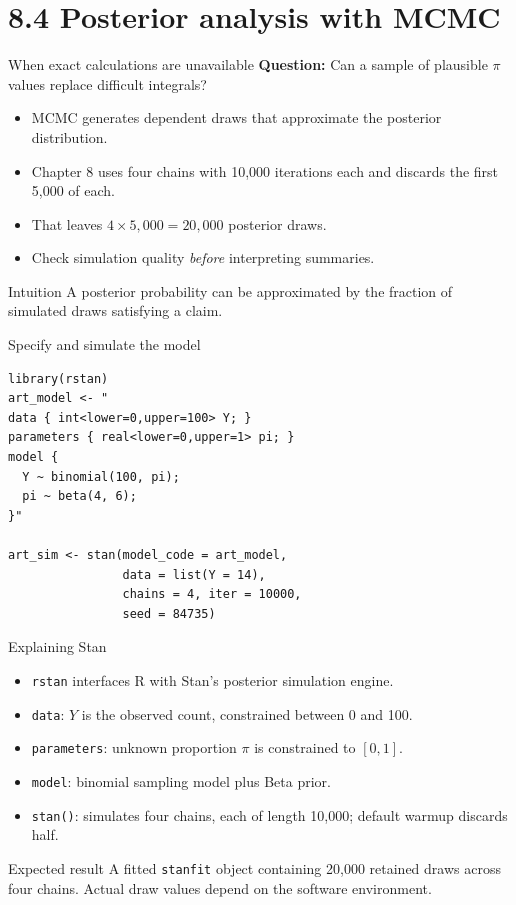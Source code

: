 \documentclass[aspectratio=43]{beamer}
\begin{document}
\section{8.4 Posterior analysis with MCMC}
\begin{frame}{When exact calculations are unavailable}
\textbf{Question:} Can a sample of plausible $\pi$ values replace difficult integrals?
\begin{itemize}
\item MCMC generates dependent draws that approximate the posterior distribution.
\item Chapter 8 uses four chains with 10,000 iterations each and discards the first 5,000 of each.
\item That leaves $4\times5{,}000=20{,}000$ posterior draws.
\item Check simulation quality \emph{before} interpreting summaries.
\end{itemize}
\begin{block}{Intuition}
A posterior probability can be approximated by the fraction of simulated draws satisfying a claim.
\end{block}
\end{frame}
\begin{frame}[fragile]{Specify and simulate the model}
\begin{lstlisting}
library(rstan)
art_model <- "
data { int<lower=0,upper=100> Y; }
parameters { real<lower=0,upper=1> pi; }
model {
  Y ~ binomial(100, pi);
  pi ~ beta(4, 6);
}"

art_sim <- stan(model_code = art_model,
                data = list(Y = 14),
                chains = 4, iter = 10000,
                seed = 84735)
\end{lstlisting}
\end{frame}

\begin{frame}{Explaining Stan}
\begin{itemize}
\item \texttt{rstan} interfaces R with Stan's posterior simulation engine.
\item \texttt{data}: $Y$ is the observed count, constrained between 0 and 100.
\item \texttt{parameters}: unknown proportion $\pi$ is constrained to $[0,1]$.
\item \texttt{model}: binomial sampling model plus Beta prior.
\item \texttt{stan()}: simulates four chains, each of length 10,000; default warmup discards half.
\end{itemize}
\begin{block}{Expected result}
A fitted \texttt{stanfit} object containing 20,000 retained draws across four chains. Actual draw values depend on the software environment.
\end{block}
\end{frame}
\end{document}
